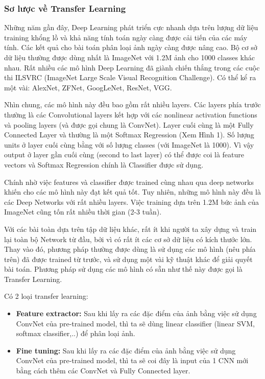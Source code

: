 \documentclass[a4paper, 12pt]{report}
\begin{document}
\subsubsection{Sơ lược về Transfer Learning}
Những năm gần đây, Deep Learning phát triển cực nhanh dựa trên lượng dữ liệu training khổng lồ và khả năng tính toán ngày càng được cải tiến của các máy tính. Các kết quả cho bài toán phân loại ảnh ngày càng được nâng cao. Bộ cơ sở dữ liệu thường được dùng nhất là ImageNet với 1.2M ảnh cho 1000 classes khác nhau. Rất nhiều các mô hình Deep Learning đã giành chiến thắng trong các cuộc thi ILSVRC (ImageNet Large Scale Visual Recognition Challenge). Có thể kể ra một vài: AlexNet, ZFNet, GoogLeNet, ResNet, VGG.\par
Nhìn chung, các mô hình này đều bao gồm rất nhiều layers. Các layers phía trước thường là các Convolutional layers kết hợp với các nonlinear activation functions và pooling layers (và được gọi chung là ConvNet). Layer cuối cùng là một Fully Connected Layer và thường là một Softmax Regression (Xem Hình 1). Số lượng units ở layer cuối cùng bằng với số lượng classes (với ImageNet là 1000). Vì vậy output ở layer gần cuối cùng (second to last layer) có thể được coi là feature vectors và Softmax Regression chính là Classifier được sử dụng.\par
Chính nhờ việc features và classifier được trained cùng nhau qua deep networks khiến cho các mô hình này đạt kết quả tốt. Tuy nhiên, những mô hình này đều là các Deep Networks với rất nhiều layers. Việc training dựa trên 1.2M bức ảnh của ImageNet cũng tốn rất nhiều thời gian (2-3 tuần).\par
Với các bài toàn dựa trên tập dữ liệu khác, rất ít khi người ta xây dựng và train lại toàn bộ Network từ đầu, bởi vì có rất ít các cơ sở dữ liệu có kích thước lớn. Thay vào đó, phương pháp thường được dùng là sử dụng các mô hình (nêu phía trên) đã được trained từ trước, và sử dụng một vài kỹ thuật khác để giải quyết bài toán. Phương pháp sử dụng các mô hình có sẵn như thế này được gọi là Transfer Learning.\par
Có 2 loại transfer learning:
\begin{itemize}
	\item \textbf{Feature extractor:} Sau khi lấy ra các đặc điểm của ảnh bằng việc sử dụng ConvNet của pre-trained model, thì ta sẽ dùng linear classifier (linear SVM, softmax classifier,..) để phân loại ảnh.
	\item \textbf{Fine tuning:} Sau khi lấy ra các đặc điểm của ảnh bằng việc sử dụng ConvNet của pre-trained model, thì ta sẽ coi đây là input của 1 CNN mới bằng cách thêm các ConvNet và Fully Connected layer. 
\end{itemize}
\end{document}
